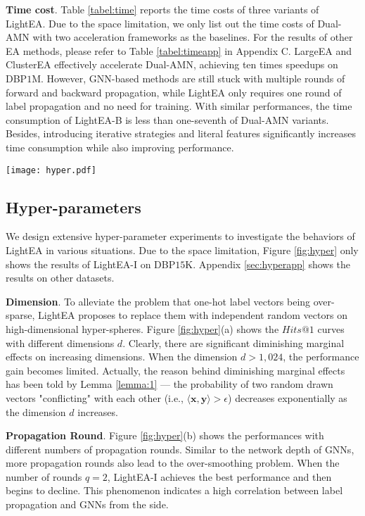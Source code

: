 \documentclass[11pt]{article}
\begin{document}
\noindent
\textbf{Time cost}.
Table \ref{tabel:time} reports the time costs of three variants of LightEA.
Due to the space limitation, we only list out the time costs of Dual-AMN with two acceleration frameworks as the baselines.
For the results of other EA methods, please refer to Table \ref{tabel:timeapp} in Appendix C.
LargeEA and ClusterEA effectively accelerate Dual-AMN, achieving ten times speedups on DBP$1$M.
However, GNN-based methods are still stuck with multiple rounds of forward and backward propagation, while LightEA only requires one round of label propagation and no need for training.
With similar performances, the time consumption of LightEA-B is less than one-seventh of Dual-AMN variants.
Besides, introducing iterative strategies and literal features significantly increases time consumption while also improving performance.

\begin{figure*}
    \centering
    \texttt{[image: hyper.pdf]}
    \caption{Hyper-parameter experiments of LightEA-I on DBP$15$K.}
    \label{fig:hyper}
\end{figure*}

\subsection{Hyper-parameters}
We design extensive hyper-parameter experiments to investigate the behaviors of LightEA in various situations.
Due to the space limitation, Figure \ref{fig:hyper} only shows the results of LightEA-I on DBP$15$K.
Appendix \ref{sec:hyperapp} shows the results on other datasets.

\noindent
\textbf{Dimension}.
To alleviate the problem that one-hot label vectors being over-sparse, LightEA proposes to replace them with independent random vectors on high-dimensional hyper-spheres.
Figure \ref{fig:hyper}(a) shows the $Hits@1$ curves with different dimensions $d$.
Clearly, there are significant diminishing marginal effects on increasing dimensions.
When the dimension $d>1,024$, the performance gain becomes limited.
Actually, the reason behind diminishing marginal effects has been told by Lemma \ref{lemma:1} --- the probability of two random drawn vectors "conflicting" with each other (i.e., $\langle\bm x,\bm y\rangle > \epsilon$) decreases exponentially as the dimension $d$ increases.

\noindent
\textbf{Propagation Round}.
Figure \ref{fig:hyper}(b) shows the performances with different numbers of propagation rounds.
Similar to the network depth of GNNs, more propagation rounds also lead to the over-smoothing problem.
When the number of rounds $q=2$, LightEA-I achieves the best performance and then begins to decline.
This phenomenon indicates a high correlation between label propagation and GNNs from the side.
\end{document}

